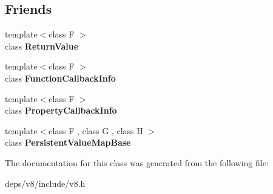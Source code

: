 \subsection*{Friends}
\begin{DoxyCompactItemize}
\item 
\hypertarget{classv8_1_1_return_value_a53f604d3d6f2dc0647df33c9979f116a}{}{\footnotesize template$<$class F $>$ }\\class {\bfseries Return\+Value}\label{classv8_1_1_return_value_a53f604d3d6f2dc0647df33c9979f116a}

\item 
\hypertarget{classv8_1_1_return_value_a76786e6fa2d0eac5e2d4f647659d0d23}{}{\footnotesize template$<$class F $>$ }\\class {\bfseries Function\+Callback\+Info}\label{classv8_1_1_return_value_a76786e6fa2d0eac5e2d4f647659d0d23}

\item 
\hypertarget{classv8_1_1_return_value_a5018adab21fade2b42f4f60e45fa1083}{}{\footnotesize template$<$class F $>$ }\\class {\bfseries Property\+Callback\+Info}\label{classv8_1_1_return_value_a5018adab21fade2b42f4f60e45fa1083}

\item 
\hypertarget{classv8_1_1_return_value_a08e2b8f164392d71811ce6cc134f33e3}{}{\footnotesize template$<$class F , class G , class H $>$ }\\class {\bfseries Persistent\+Value\+Map\+Base}\label{classv8_1_1_return_value_a08e2b8f164392d71811ce6cc134f33e3}

\end{DoxyCompactItemize}


The documentation for this class was generated from the following file\+:\begin{DoxyCompactItemize}
\item 
deps/v8/include/v8.\+h\end{DoxyCompactItemize}
